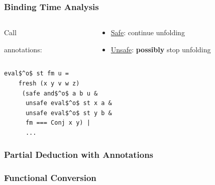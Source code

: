 \documentclass[xcolor=table, aspectratio=169]{beamer}
\begin{document}
\begin{frame}[fragile]
  \frametitle{Binding Time Analysis}

  \begin{center}
    \begin{minipage}{0.5\textwidth}
      \begin{columns}[T]
        \begin{column}{0.3\textwidth}
          Call 
          
          annotations: 
        \end{column}
        \begin{column}{0.8\textwidth}
         \begin{minipage}{\textwidth}
            \begin{itemize}
                \item \underline{Safe}: continue unfolding
                \item \underline{Unsafe}: \textbf{possibly} stop unfolding 
            \end{itemize}
          \end{minipage}
        \end{column}
    \end{columns}
  \end{minipage}
  \end{center}

  \vspace{0.3cm}

  \begin{center}
    \begin{minipage}[c]{0.38\textwidth}
        \begin{lstlisting}[frame=tb]
   eval$^o$ st fm u =
    fresh (x y v w z)
     (safe and$^o$ a b u &
      unsafe eval$^o$ st x a &
      unsafe eval$^o$ st y b &
      fm === Conj x y) |
      ...
        \end{lstlisting}
      \end{minipage}
  \end{center}  

\end{frame}

\begin{frame}[fragile]
  \frametitle{Partial Deduction with Annotations}

  
\end{frame}


\begin{frame}[fragile]
  \frametitle{Functional Conversion}

    
\end{frame}
\end{document}
